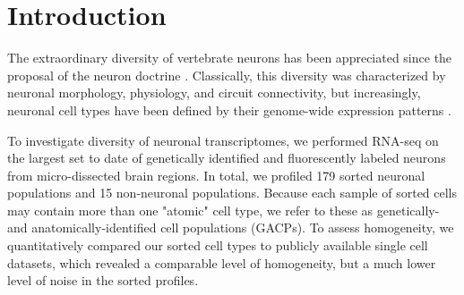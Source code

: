 \section*{Introduction}

The extraordinary diversity of vertebrate neurons has been appreciated since the proposal of the neuron doctrine \citep{Cajal_1888}. Classically, this diversity was characterized by neuronal morphology, physiology, and circuit connectivity, but increasingly, neuronal cell types have been defined by their genome-wide expression patterns \citep{Sugino_2005,Doyle_2008}. %


To investigate diversity of neuronal transcriptomes, we performed RNA-seq on the largest set to date of genetically identified and fluorescently labeled neurons from micro-dissected brain regions. In total, we profiled 179 sorted neuronal populations and 15 non-neuronal populations. Because each sample of sorted cells may contain more than one "atomic" cell type, we refer to these as genetically- and anatomically-identified cell populations (GACPs). To assess  homogeneity, we quantitatively compared our sorted cell types to publicly available single cell datasets, which revealed a comparable level of homogeneity, but a much lower level of noise in the sorted profiles. 


